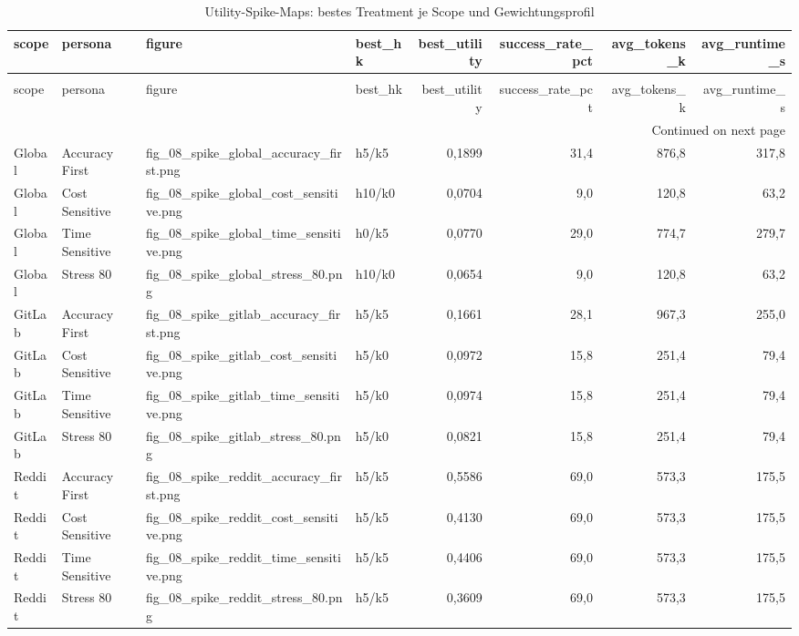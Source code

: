 \begin{longtable}{llllrrrr}
\caption{Utility-Spike-Maps: bestes Treatment je Scope und Gewichtungsprofil} \label{tab:spike-utility-best-by-scope-persona} \\
\toprule
scope & persona & figure & best\_hk & best\_utility & success\_rate\_pct & avg\_tokens\_k & avg\_runtime\_s \\
\midrule
\endfirsthead
\caption[]{Utility-Spike-Maps: bestes Treatment je Scope und Gewichtungsprofil} \\
\toprule
scope & persona & figure & best\_hk & best\_utility & success\_rate\_pct & avg\_tokens\_k & avg\_runtime\_s \\
\midrule
\endhead
\midrule
\multicolumn{8}{r}{Continued on next page} \\
\midrule
\endfoot
\bottomrule
\endlastfoot
Global & Accuracy First & fig\_08\_spike\_global\_accuracy\_first.png & h5/k5 & 0,1899 & 31,4 & 876,8 & 317,8 \\
Global & Cost Sensitive & fig\_08\_spike\_global\_cost\_sensitive.png & h10/k0 & 0,0704 & 9,0 & 120,8 & 63,2 \\
Global & Time Sensitive & fig\_08\_spike\_global\_time\_sensitive.png & h0/k5 & 0,0770 & 29,0 & 774,7 & 279,7 \\
Global & Stress 80 & fig\_08\_spike\_global\_stress\_80.png & h10/k0 & 0,0654 & 9,0 & 120,8 & 63,2 \\
GitLab & Accuracy First & fig\_08\_spike\_gitlab\_accuracy\_first.png & h5/k5 & 0,1661 & 28,1 & 967,3 & 255,0 \\
GitLab & Cost Sensitive & fig\_08\_spike\_gitlab\_cost\_sensitive.png & h5/k0 & 0,0972 & 15,8 & 251,4 & 79,4 \\
GitLab & Time Sensitive & fig\_08\_spike\_gitlab\_time\_sensitive.png & h5/k0 & 0,0974 & 15,8 & 251,4 & 79,4 \\
GitLab & Stress 80 & fig\_08\_spike\_gitlab\_stress\_80.png & h5/k0 & 0,0821 & 15,8 & 251,4 & 79,4 \\
Reddit & Accuracy First & fig\_08\_spike\_reddit\_accuracy\_first.png & h5/k5 & 0,5586 & 69,0 & 573,3 & 175,5 \\
Reddit & Cost Sensitive & fig\_08\_spike\_reddit\_cost\_sensitive.png & h5/k5 & 0,4130 & 69,0 & 573,3 & 175,5 \\
Reddit & Time Sensitive & fig\_08\_spike\_reddit\_time\_sensitive.png & h5/k5 & 0,4406 & 69,0 & 573,3 & 175,5 \\
Reddit & Stress 80 & fig\_08\_spike\_reddit\_stress\_80.png & h5/k5 & 0,3609 & 69,0 & 573,3 & 175,5 \\

\end{longtable}
